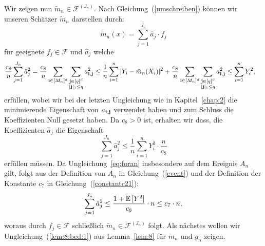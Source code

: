 {Wir zeigen nun $\tilde{m}_n \in \mathcal{F}^{(J_n)}$.
Nach Gleichung~(\ref{umschreiben}) können wir unseren Schätzer $\tilde{m}_n$ darstellen durch:
$$\tilde{m}_n(x) = \sum_{j = 1}^{J_n}\hat{a}_j \cdot f_j$$
für geeignete $f_j \in \mathcal{F}$ und $\hat{a}_j$ welche 
\begin{equation*}
\begin{split}
\frac{c_8}{n}\sum_{j = 1}^{J_n} \hat{a}_j^2 & = \frac{c_8}{n} \sum_{\mathbf{i} \in [M_n]^d} \sum_{\substack{\mathbf{j} \in [q]^d \\ |\mathbf{j}|_1 \leq q}} a_{\mathbf{i},\mathbf{j}}^2
\leq \frac{1}{n} \sum_{i = 1}^n|Y_i - \tilde{m}_n(X_i)|^2 + \frac{c_8}{n} \sum_{\mathbf{i} \in [M_n]^d} \sum_{\substack{\mathbf{j} \in [q]^d \\ |\mathbf{j}|_1 \leq q}} a_{\mathbf{i},\mathbf{j}}^2 
\leq \sum_{i = 1}^n Y_i^2,
\end{split}
\end{equation*}
erfüllen, wobei wir bei der letzten Ungleichung wie in Kapitel~\ref{chap:2} die minimierende Eigenschaft von $a_{\mathbf{i},\mathbf{j}}$ verwendet haben und zum Schluss die Koeffizienten Null gesetzt haben. Da $c_8 > 0$ ist, erhalten wir dass, die Koeffizienten $\hat{a}_j$ die Eigenschaft
\begin{equation}
\label{eq:foran}
\sum_{j = 1}^{J_n} \hat{a}_j^2  \leq \frac{1}{n}\sum_{i = 1}^n Y_i^2 \cdot \frac{n}{c_8}
\end{equation}
erfüllen müssen.
Da Ungleichung~\ref{eq:foran} insbesondere auf dem Ereignis $A_n$ gilt, folgt aus der Definition von $A_n$ in Gleichung~(\ref{event}) und der Definition der Konstante $c_7$ in Gleichung~(\ref{constantc21}):
$$\sum_{j = 1}^{J_n}\hat{a}_j^2 \leq \frac{1 + \mathbb{E}\,[Y^2]}{c_8} \cdot n \leq c_7 \cdot n,$$
woraus durch $f_j \in \mathcal{F}$ schließlich $\tilde{m}_n \in \mathcal{F}^{(J_n)}$ folgt.
Als nächstes wollen wir Ungleichung~(\ref{lem:8:bed:1}) aus Lemma~\ref{lem:8} für $\tilde{m}_n$ und $g_n$ zeigen.

}
